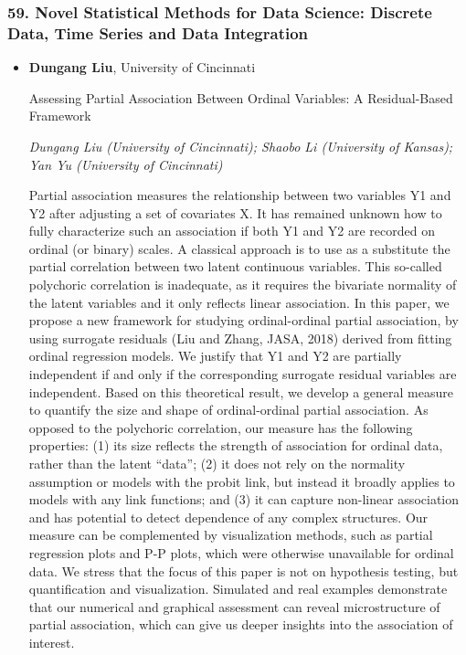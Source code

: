 \subsubsection*{59. Novel Statistical Methods for Data Science: Discrete Data, Time Series and Data Integration}

\begin{itemize}
\item \textbf{Dungang Liu}, University of Cincinnati

Assessing Partial Association Between Ordinal Variables: A Residual-Based Framework

\emph{\footnotesize Dungang Liu (University of Cincinnati); Shaobo Li (University of Kansas); Yan Yu (University of Cincinnati)}

Partial association measures the relationship between two variables Y1 and Y2 after adjusting a set of covariates X. It has remained unknown how to fully characterize such an association if both Y1 and Y2 are recorded on ordinal (or binary) scales. A classical approach is to use as a substitute the partial correlation between two latent continuous variables. This so-called polychoric correlation is inadequate, as it requires the bivariate normality of the latent variables and it only reflects linear association. In this paper, we propose a new framework for studying ordinal-ordinal partial association, by using surrogate residuals (Liu and Zhang, JASA, 2018) derived from fitting ordinal regression models. We justify that Y1 and Y2 are partially independent if and only if the corresponding surrogate residual variables are independent. Based on this theoretical result, we develop a general measure to quantify the size and shape of ordinal-ordinal partial association. As opposed to the polychoric correlation, our measure has the following properties: (1) its size reflects the strength of association for ordinal data, rather than the latent ``data''; (2) it does not rely on the normality assumption or models with the probit link, but instead it broadly applies to models with any link functions; and (3) it can capture non-linear association and has potential to detect dependence of any complex structures. Our measure can be complemented by visualization methods, such as partial regression plots and P-P plots, which were otherwise unavailable for ordinal data. We stress that the focus of this paper is not on hypothesis testing, but quantification and visualization. Simulated and real examples demonstrate that our numerical and graphical assessment can reveal microstructure of partial association, which can give us deeper insights into the association of interest.


\end{itemize}
